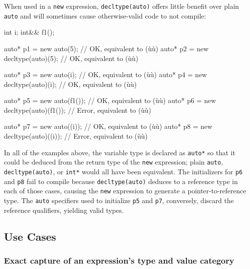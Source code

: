 When used in a \lstinline!new! expression, \lstinline!decltype(auto)! offers
little benefit over plain \lstinline!auto! and will sometimes cause
otherwise-valid code to not compile:

\begin{emcppslisting}[emcppsstandards={c++14}]
int   i;
int&& f1();

auto* p1 = new auto(5);               // OK, equivalent to (ù{}ù)
auto* p2 = new decltype(auto)(5);     // OK, equivalent to (ù{}ù)

auto* p3 = new auto(i);               // OK, equivalent to (ù{}ù)
auto* p4 = new decltype(auto)(i);     // OK, equivalent to (ù{}ù)

auto* p5 = new auto(f1());            // OK, equivalent to (ù{}ù)
auto* p6 = new decltype(auto)(f1());  // Error, equivalent to (ù{}ù)

auto* p7 = new auto((i));             // OK, equivalent to (ù{}ù)
auto* p8 = new decltype(auto)((i));   // Error, equivalent to (ù{}ù)
\end{emcppslisting}
    

In all of the examples above, the variable type is declared as
\lstinline!auto*! so that it could be deduced from the return type of the
\lstinline!new! expression; plain \lstinline!auto!, \lstinline!decltype(auto)!,
or \lstinline!int*! would all have been equivalent. The initializers for
\lstinline!p6! and \lstinline!p8! fail to compile because
\lstinline!decltype(auto)! deduces to a reference type in each of those
cases, causing the \lstinline!new! expression to generate a
pointer-to-reference type. The \lstinline!auto! specifiers used to
initialize \lstinline!p5! and \lstinline!p7!, conversely, discard the
reference qualifiers, yielding valid types.

\subsection[Use Cases]{Use Cases}\label{use-cases}

\subsubsection[Exact capture of an expression’s type and value category]{Exact capture of an expression’s type and value category}\label{exact-capture-of-an-expression’s-type-and-value-category}

